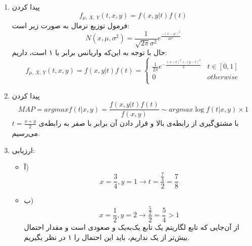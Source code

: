 
\begin{enumerate}
	\item پیدا کردن 
	$$f_{\mu, \: X, \: Y}(t, x, y) = f(x, y | t) f(t)$$
	فرمول توزیع نرمال به صورت زیر است:
	$$N(x, \mu, \sigma^2) = \frac{1}{\sqrt{2\pi} \sigma^2} e^{\frac{-(x - \mu) ^2}{2\sigma^2}}$$
	حال با توجه به این‌که واریانس برابر با ۱ است، داریم:
	$$f_{\mu, \: X, \: Y}(t, x, y) = f(x, y | t) f(t) = \begin{cases}
	\frac{1}{2\pi} e^{-\frac{(x - t)^2 + (y - t)^2}{2}} & t \in [0, 1] \\
	0 & otherwise \\
	\end{cases}$$
	\item 
	پیدا کردن 
	$$MAP = arg max f(t|x, y) = \frac{f(x, y | t) f(t)}{f(x, y)} \sim arg max \log{f(t | x, y) \times 1}$$ 
	با مشتق‌گیری از رابطه‌ی بالا و قرار دادن آن برابر با صفر به رابطه‌ی $t = \frac{x + y}{2}$ می‌رسیم.
	\item 
	ارزیابی:
	\begin{itemize}
		\item آ)
	$$x = \frac{3}{4}, y = 1 \rightarrow t = \frac{\frac{7}{4}}{2} = \frac{7}{8}$$
		\item ب)
		$$x = \frac{1}{2}, y = 2 \rightarrow \frac{\frac{5}{2}}{2} = \frac{5}{4} > 1$$
		از آن‌جایی که تابع لگاریتم یک تابع یک‌به‌یک و صعودی است و مقدار احتمال بیش‌تر از یک نداریم، باید این احتمال را ۱ در نظر بگیریم.
	\end{itemize}
\end{enumerate}